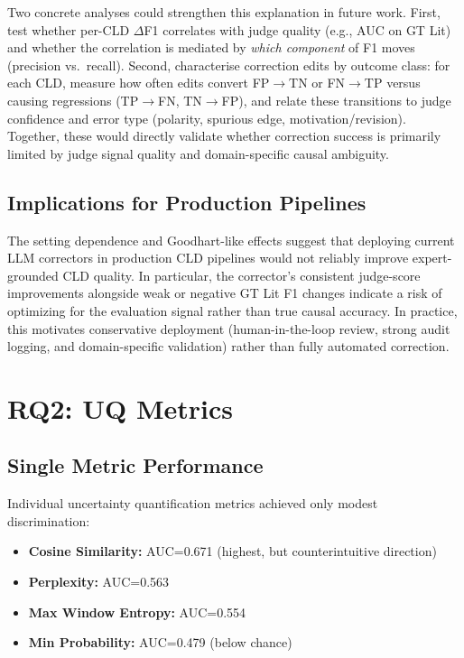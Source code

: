 Two concrete analyses could strengthen this explanation in future work. First, test whether per-CLD $\Delta$F1 correlates with judge quality (e.g., AUC on GT Lit) and whether the correlation is mediated by \emph{which component} of F1 moves (precision vs.\ recall). Second, characterise correction edits by outcome class: for each CLD, measure how often edits convert FP$\rightarrow$TN or FN$\rightarrow$TP versus causing regressions (TP$\rightarrow$FN, TN$\rightarrow$FP), and relate these transitions to judge confidence and error type (polarity, spurious edge, motivation/revision). Together, these would directly validate whether correction success is primarily limited by judge signal quality and domain-specific causal ambiguity.

\subsection{Implications for Production Pipelines}

The setting dependence and Goodhart-like effects suggest that deploying current LLM correctors in production CLD pipelines would not reliably improve expert-grounded CLD quality. In particular, the corrector's consistent judge-score improvements alongside weak or negative GT Lit F1 changes indicate a risk of optimizing for the evaluation signal rather than true causal accuracy. In practice, this motivates conservative deployment (human-in-the-loop review, strong audit logging, and domain-specific validation) rather than fully automated correction.

\section{RQ2: UQ Metrics}
\label{sec:discussion_rq2}

\subsection{Single Metric Performance}

Individual uncertainty quantification metrics achieved only modest discrimination:
\begin{itemize}[noitemsep]
    \item \textbf{Cosine Similarity:} AUC=0.671 (highest, but counterintuitive direction)
    \item \textbf{Perplexity:} AUC=0.563
    \item \textbf{Max Window Entropy:} AUC=0.554
    \item \textbf{Min Probability:} AUC=0.479 (below chance)
\end{itemize}

